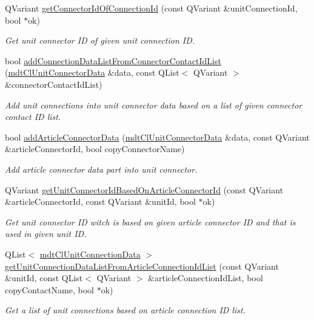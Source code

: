 \begin{DoxyCompactItemize}
Q\-Variant \hyperlink{classmdt_cl_unit_ab7aca8211857c7842102593aaf07eaa1}{get\-Connector\-Id\-Of\-Connection\-Id} (const Q\-Variant \&unit\-Connection\-Id, bool $\ast$ok)
\begin{DoxyCompactList}\small\item\em Get unit connector I\-D of given unit connection I\-D. \end{DoxyCompactList}\item 
bool \hyperlink{classmdt_cl_unit_ac05aad687744aaedeef602075e28fdf7}{add\-Connection\-Data\-List\-From\-Connector\-Contact\-Id\-List} (\hyperlink{classmdt_cl_unit_connector_data}{mdt\-Cl\-Unit\-Connector\-Data} \&data, const Q\-List$<$ Q\-Variant $>$ \&connector\-Contact\-Id\-List)
\begin{DoxyCompactList}\small\item\em Add unit connections into unit connector data based on a list of given connector contact I\-D list. \end{DoxyCompactList}\item 
bool \hyperlink{classmdt_cl_unit_ad9b29bd9b0ad70047d439e04f109a1cd}{add\-Article\-Connector\-Data} (\hyperlink{classmdt_cl_unit_connector_data}{mdt\-Cl\-Unit\-Connector\-Data} \&data, const Q\-Variant \&article\-Connector\-Id, bool copy\-Connector\-Name)
\begin{DoxyCompactList}\small\item\em Add article connector data part into unit connector. \end{DoxyCompactList}\item 
Q\-Variant \hyperlink{classmdt_cl_unit_a08e75aefd5bada2cfd1a0393b6e6c460}{get\-Unit\-Connector\-Id\-Based\-On\-Article\-Connector\-Id} (const Q\-Variant \&article\-Connector\-Id, const Q\-Variant \&unit\-Id, bool $\ast$ok)
\begin{DoxyCompactList}\small\item\em Get unit connector I\-D witch is based on given article connector I\-D and that is used in given unit I\-D. \end{DoxyCompactList}\item 
Q\-List$<$ \hyperlink{classmdt_cl_unit_connection_data}{mdt\-Cl\-Unit\-Connection\-Data} $>$ \hyperlink{classmdt_cl_unit_a93002a29107f78901fe3aa87a83005db}{get\-Unit\-Connection\-Data\-List\-From\-Article\-Connection\-Id\-List} (const Q\-Variant \&unit\-Id, const Q\-List$<$ Q\-Variant $>$ \&article\-Connection\-Id\-List, bool copy\-Contact\-Name, bool $\ast$ok)
\begin{DoxyCompactList}\small\item\em Get a list of unit connections based on article connection I\-D list. \end{DoxyCompactList}\item 

\end{DoxyCompactItemize}
